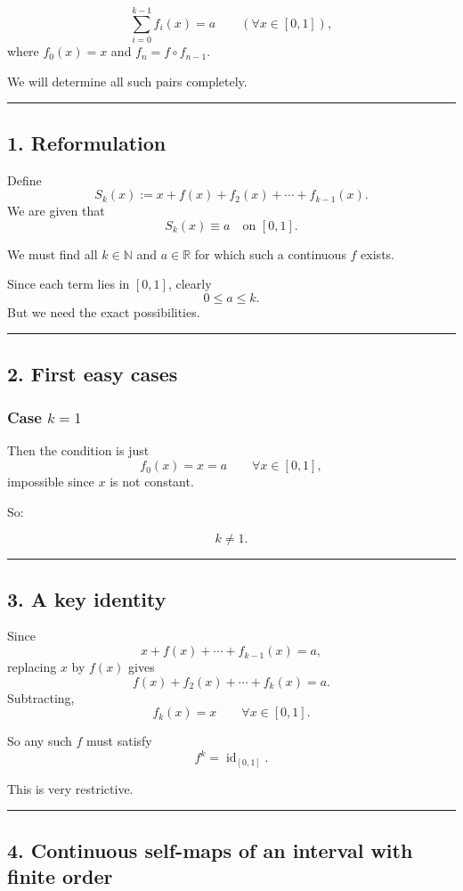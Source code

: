 \documentclass[12pt,a4paper]{article}
\begin{document}
\[
\sum_{i=0}^{k-1} f_i(x)=a \qquad (\forall x\in[0,1]),
\]
where \(f_0(x)=x\) and \(f_n=f\circ f_{n-1}\).

We will determine all such pairs completely.


\medskip\hrule\medskip


\subsection*{1. Reformulation}

Define
\[
S_k(x):=x+f(x)+f_2(x)+\cdots+f_{k-1}(x).
\]
We are given that
\[
S_k(x)\equiv a \quad \text{on }[0,1].
\]

We must find all \(k\in\mathbb N\) and \(a\in\mathbb R\) for which such a continuous \(f\) exists.

Since each term lies in \([0,1]\), clearly
\[
0\le a\le k.
\]
But we need the exact possibilities.


\medskip\hrule\medskip


\subsection*{2. First easy cases}

\subsubsection*{Case \(k=1\)}

Then the condition is just
\[
f_0(x)=x=a \qquad \forall x\in[0,1],
\]
impossible since \(x\) is not constant.

So:

\[
k\neq 1.
\]


\medskip\hrule\medskip


\subsection*{3. A key identity}

Since
\[
x+f(x)+\cdots+f_{k-1}(x)=a,
\]
replacing \(x\) by \(f(x)\) gives
\[
f(x)+f_2(x)+\cdots+f_k(x)=a.
\]
Subtracting,
\[
f_k(x)=x \qquad \forall x\in[0,1].
\]

So any such \(f\) must satisfy
\[
f^k=\operatorname{id}_{[0,1]}.
\]

This is very restrictive.


\medskip\hrule\medskip


\subsection*{4. Continuous self-maps of an interval with finite order}
\end{document}
